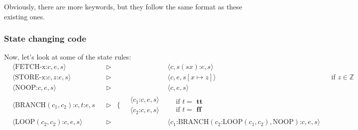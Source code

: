 \documentclass[11pt,a4paper,headsepline,titlepage,dvipsnames,cmyk]{scrartcl}
\begin{document}
Obviously, there are more keywords, but they follow the same format as
these existing ones.

\subsubsection{State changing code}%
\label{ssub:code-2}
Now, let's look at some of the state rules:
\begin{align*}
    &\langle \text{FETCH-x:}c, e, s \rangle & &\triangleright & &\langle c,
    s(s x)\text{:}e, s \rangle \\
    &\langle \text{STORE-x:}c, z\text{:}e, s \rangle & &\triangleright &
    &\langle c, e, s[x \mapsto z] \rangle & &\text{if } z \in \mathbb{Z} \\
    &\langle \text{NOOP:}c, e, s \rangle & &\triangleright & &\langle c,
    e, s \rangle \\
    &\langle \text{BRANCH}(c_1, c_2)\text{:}c, t\text{:}e, s
    & &\triangleright &\bigg \{ \
    \begin{split}
    &\langle c_1 \text{:} c, e, s \rangle 
    \\
    & \langle c_2 \text{:} c, e, s \rangle 
    \end{split}
    &\begin{split}
        &\text{if } t = \textbf{ tt} \\
        &\text{if } t = \textbf{ ff}
    \end{split} \\
    &\langle \text{LOOP}(c_2, c_2) \text{:}c, e, s \rangle &
    &\triangleright & &\langle c_1
\text{:BRANCH}(c_2\text{:LOOP}(c_1,c_2), \text{NOOP})\text{:}c, e, s\rangle
\end{align*}
\end{document}
